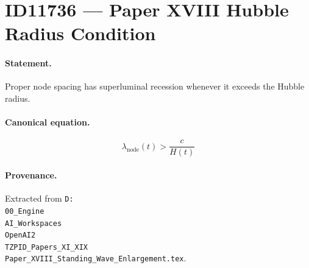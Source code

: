 \section*{ID11736 --- Paper XVIII Hubble Radius Condition}

\paragraph{Statement.}
Proper node spacing has superluminal recession whenever it exceeds the Hubble radius.

\paragraph{Canonical equation.}
\[
\lambda_{\mathrm{node}}(t)>\frac{c}{H(t)}
\]

\paragraph{Provenance.}
Extracted from \texttt{D:\\00\_Engine\\AI\_Workspaces\\OpenAI2\\TZPID\_Papers\_XI\_XIX\\Paper\_XVIII\_Standing\_Wave\_Enlargement.tex}.
